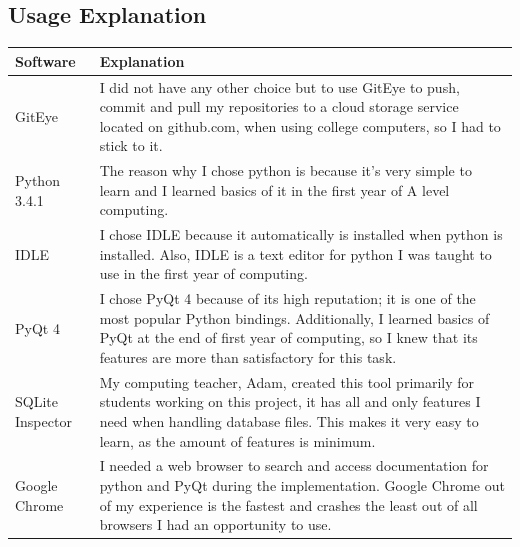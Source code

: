 \subsection{Usage Explanation}
\begin{center}
    \begin{tabular}{|p{5cm}|p{5cm}|}
        \hline
        \textbf{Software} &  \textbf{Explanation}\\ \hline
GitEye & I did not have any other choice but to use GitEye to push, commit and pull my repositories to a cloud storage service located on github.com, when using college computers, so I had to stick to it.
\\ \hline
Python 3.4.1 & The reason why I chose python is because it's very simple to learn and I learned basics of it in the first year of A level computing.
\\ \hline
IDLE & I chose IDLE because it automatically is installed when python is installed. Also, IDLE is a text editor for python I was taught to use in the first year of computing.
\\ \hline
PyQt 4 & I chose PyQt 4 because of its high reputation; it is one of the most popular Python bindings. Additionally, I learned basics of PyQt at the end of first year of computing, so I knew that its features are more than satisfactory for this task.
\\ \hline
SQLite Inspector & My computing teacher, Adam, created this tool primarily for students working on this project, it has all and only features I need when handling database files. This makes it very easy to learn, as the amount of features is minimum.
\\ \hline
Google Chrome & I needed a web browser to search and access documentation for python and PyQt during the implementation. Google Chrome out of my experience is the fastest and crashes the least out of all browsers I had an opportunity to use.
\\ \hline
    \end{tabular}
\end{center}

